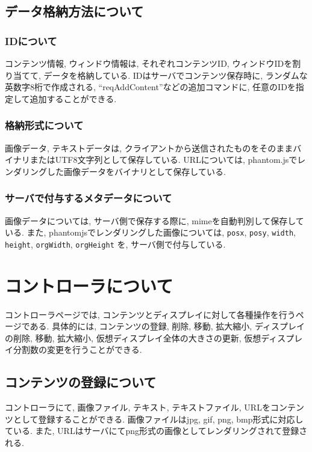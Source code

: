 \documentclass[a4paper,10pt,oneside]{jsbook}
\begin{document}
\section{データ格納方法について}
\subsection{IDについて}
コンテンツ情報, ウィンドウ情報は, それぞれコンテンツID, ウィンドウIDを割り当てて, データを格納している. IDはサーバでコンテンツ保存時に, ランダムな英数字8桁で作成される, “reqAddContent”などの追加コマンドに, 任意のIDを指定して追加することができる.

\subsection{格納形式について}
画像データ, テキストデータは, クライアントから送信されたものをそのままバイナリまたはUTF8文字列として保存している. URLについては, phantom.jsでレンダリングした画像データをバイナリとして保存している.

\subsection{サーバで付与するメタデータについて}
画像データについては, サーバ側で保存する際に, mimeを自動判別して保存している. また, phantomjsでレンダリングした画像については, \verb+posx+, \verb+posy+, \verb+width+, \verb+height+, \verb+orgWidth+, \verb+orgHeight+ を, サーバ側で付与している.


\chapter{コントローラについて}
コントローラページでは, コンテンツとディスプレイに対して各種操作を行うページである. 具体的には, コンテンツの登録, 削除, 移動, 拡大縮小, ディスプレイの削除, 移動, 拡大縮小, 仮想ディスプレイ全体の大きさの更新, 仮想ディスプレイ分割数の変更を行うことができる.

\section{コンテンツの登録について}
コントローラにて, 画像ファイル, テキスト, テキストファイル, URLをコンテンツとして登録することができる. 画像ファイルはjpg, gif, png, bmp形式に対応している. また, URLはサーバにてpng形式の画像としてレンダリングされて登録される.
\end{document}
